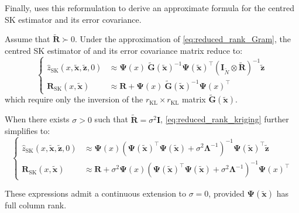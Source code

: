 Finally,  uses this reformulation to derive an approximate formula for the centred SK estimator and its error covariance.

\begin{proposition}\label{th:reduced_rank_kriging}
	Assume that $\tilde{\mathbf{R}}\succ0$. Under the approximation of \eqref{eq:reduced_rank_Gram}, the centred SK estimator of  and its error covariance matrix reduce to:
	\begin{equation}
		\left\{\begin{aligned}
		\hat{z}_{\mathrm{SK}}(x,\tilde{\mathbf{x}},\tilde{\mathbf{z}},0)&\approx\boldsymbol{\Psi}(x)\:\tilde{\mathbf{G}}(\tilde{\mathbf{x}})^{-1}\boldsymbol{\Psi}(\tilde{\mathbf{x}})^\top\left(\mathbf{I}_{\tilde{N}}\otimes\tilde{\mathbf{R}}\right)^{-1}\tilde{\mathbf{z}}\\
		\mathbf{R}_{\mathrm{SK}}(x,\tilde{\mathbf{x}})&\approx \mathbf{R}+\boldsymbol{\Psi}(x)\:\tilde{\mathbf{G}}(\tilde{\mathbf{x}})^{-1}\boldsymbol{\Psi}(x)^\top
		\end{aligned}\right.\label{eq:reduced_rank_kriging}
	\end{equation}
	which require only the inversion of the $r_{\mathrm{KL}}\times r_{\mathrm{KL}}$ matrix $\tilde{\mathbf{G}}(\tilde{\mathbf{x}})$.

	When there exists $\sigma>0$ such that $\tilde{\mathbf{R}}=\sigma^2\mathbf{I}$, \eqref{eq:reduced_rank_kriging} further simplifies to:
	\begin{equation}
		\left\{\begin{aligned}
		\hat{z}_{\mathrm{SK}}(x,\tilde{\mathbf{x}},\tilde{\mathbf{z}},0)&\approx\boldsymbol{\Psi}(x)\left(\boldsymbol{\Psi}(\tilde{\mathbf{x}})^\top\boldsymbol{\Psi}(\tilde{\mathbf{x}})+\sigma^2\boldsymbol{\Lambda}^{-1}\right)^{-1}\boldsymbol{\Psi}(\tilde{\mathbf{x}})^\top\tilde{\mathbf{z}}\\
		\mathbf{R}_{\mathrm{SK}}(x,\tilde{\mathbf{x}})&\approx \mathbf{R}+\sigma^2\boldsymbol{\Psi}(x)\left(\boldsymbol{\Psi}(\tilde{\mathbf{x}})^\top\boldsymbol{\Psi}(\tilde{\mathbf{x}})+\sigma^2\boldsymbol{\Lambda}^{-1}\right)^{-1}\boldsymbol{\Psi}(x)^\top
		\end{aligned}\right.
	\end{equation}

	These expressions admit a continuous extension to $\sigma=0$, provided $\boldsymbol{\Psi}(\tilde{\mathbf{x}})$ has full column rank.
\end{proposition}

